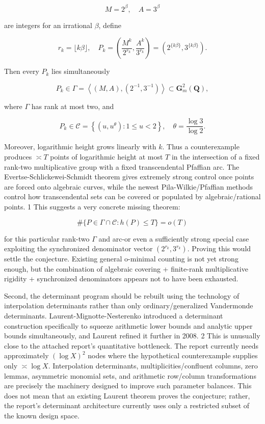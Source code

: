 \documentclass[10pt]{article}
\begin{document}
$$
M=2^{\beta}, \quad A=3^{\beta}
$$

are integers for an irrational $\beta$, define

$$
r_{k}=\lfloor k \beta\rfloor, \quad P_{k}=\left(\frac{M^{k}}{2^{r_{k}}}, \frac{A^{k}}{3^{r_{k}}}\right)=\left(2^{\{k \beta\}}, 3^{\{k \beta\}}\right) .
$$

Then every $P_{k}$ lies simultaneously

$$
P_{k} \in \Gamma=\left\langle(M, A),\left(2^{-1}, 3^{-1}\right)\right\rangle \subset \mathbf{G}_{m}^{2}(\mathbf{Q}),
$$

where $\Gamma$ has rank at most two, and

$$
P_{k} \in \mathcal{C}=\left\{\left(u, u^{\theta}\right): 1 \leq u<2\right\}, \quad \theta=\frac{\log 3}{\log 2} .
$$

Moreover, logarithmic height grows linearly with $k$. Thus a counterexample produces $\asymp T$ points of logarithmic height at most $T$ in the intersection of a fixed rank-two multiplicative group with a fixed transcendental Pfaffian arc. The Evertse-Schlickewei-Schmidt theorem gives extremely strong control once points are forced onto algebraic curves, while the newest Pila-Wilkie/Pfaffian methods control how transcendental sets can be covered or populated by algebraic/rational points. 1 This suggests a very concrete missing theorem:

$$
\#\{P \in \Gamma \cap \mathcal{C}: h(P) \leq T\}=o(T)
$$

for this particular rank-two $\Gamma$ and arc-or even a sufficiently strong special case exploiting the synchronized denominator vector $\left(2^{r_{k}}, 3^{r_{k}}\right)$. Proving this would settle the conjecture. Existing general o-minimal counting is not yet strong enough, but the combination of algebraic covering + finite-rank multiplicative rigidity + synchronized denominators appears not to have been exhausted.

Second, the determinant program should be rebuilt using the technology of interpolation determinants rather than only ordinary/generalized Vandermonde determinants. Laurent-Mignotte-Nesterenko introduced a determinant construction specifically to squeeze arithmetic lower bounds and analytic upper bounds simultaneously, and Laurent refined it further in 2008. 2 This is unusually close to the attached report's quantitative bottleneck. The report currently needs approximately $(\log X)^{2}$ nodes where the hypothetical counterexample supplies only $\asymp \log X$. Interpolation determinants, multiplicities/confluent columns, zero lemmas, asymmetric monomial sets, and arithmetic row/column transformations are precisely the machinery designed to improve such parameter balances. This does not mean that an existing Laurent theorem proves the conjecture; rather, the report's determinant architecture currently uses only a restricted subset of the known design space.
\end{document}
